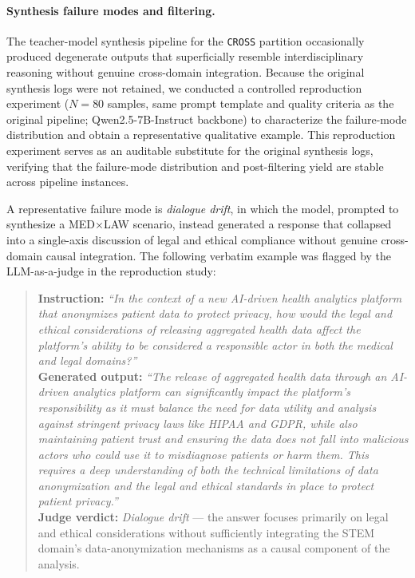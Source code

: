 \documentclass[a4paper,fleql,doubleblind]{cas-sc}
\begin{document}
\paragraph{Synthesis failure modes and filtering.}
The teacher-model synthesis pipeline for the \texttt{CROSS} partition
occasionally produced degenerate outputs that superficially resemble
interdisciplinary reasoning without genuine cross-domain integration.
Because the original synthesis logs were not retained, we conducted a
controlled reproduction experiment ($N{=}80$ samples, same prompt template
and quality criteria as the original pipeline; Qwen2.5-7B-Instruct
backbone) to characterize the failure-mode distribution and obtain a
representative qualitative example. This reproduction experiment serves as
an auditable substitute for the original synthesis logs, verifying that
the failure-mode distribution and post-filtering yield are stable across
pipeline instances.

A representative failure mode is \textit{dialogue drift}, in which the
model, prompted to synthesize a \textsc{MED}$\times$\textsc{LAW} scenario,
instead generated a response that collapsed into a single-axis discussion
of legal and ethical compliance without genuine cross-domain causal
integration. The following verbatim example was flagged by the LLM-as-a-judge
in the reproduction study:
\begin{quote}
\small
\textbf{Instruction:} \textit{``In the context of a new AI-driven health
analytics platform that anonymizes patient data to protect privacy, how
would the legal and ethical considerations of releasing aggregated health
data affect the platform's ability to be considered a responsible actor in
both the medical and legal domains?''}\\[4pt]
\textbf{Generated output:} \textit{``The release of aggregated health data
through an AI-driven analytics platform can significantly impact the
platform's responsibility as it must balance the need for data utility and
analysis against stringent privacy laws like HIPAA and GDPR, while also
maintaining patient trust and ensuring the data does not fall into
malicious actors who could use it to misdiagnose patients or harm them.
This requires a deep understanding of both the technical limitations of
data anonymization and the legal and ethical standards in place to protect
patient privacy.''}\\[4pt]
\textbf{Judge verdict:} \textit{Dialogue drift} --- the answer focuses
primarily on legal and ethical considerations without sufficiently
integrating the \textsc{STEM} domain's data-anonymization mechanisms as a
causal component of the analysis.
\end{quote}
\end{document}
